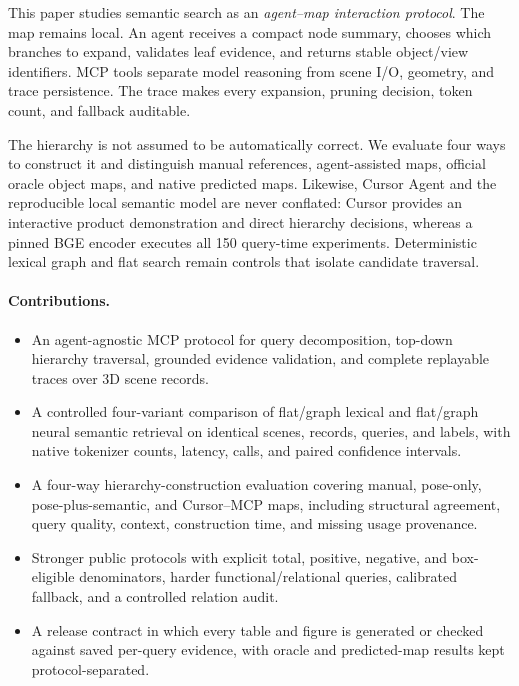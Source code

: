 \documentclass[10pt,twocolumn,letterpaper]{article}
\begin{document}
This paper studies semantic search as an \emph{agent--map interaction
protocol}. The map remains local. An agent receives a compact node summary,
chooses which branches to expand, validates leaf evidence, and returns stable
object/view identifiers. MCP tools separate model reasoning from scene I/O,
geometry, and trace persistence. The trace makes every expansion, pruning
decision, token count, and fallback auditable.

The hierarchy is not assumed to be automatically correct. We evaluate four
ways to construct it and distinguish manual references, agent-assisted maps,
official oracle object maps, and native predicted maps. Likewise, Cursor Agent
and the reproducible local semantic model are never conflated: Cursor provides
an interactive product demonstration and direct hierarchy decisions, whereas a
pinned BGE encoder executes all 150 query-time experiments. Deterministic
lexical graph and flat search remain controls that isolate candidate traversal.

\paragraph{Contributions.}
\begin{itemize}
  \item An agent-agnostic MCP protocol for query decomposition, top-down
  hierarchy traversal, grounded evidence validation, and complete replayable
  traces over 3D scene records.
  \item A controlled four-variant comparison of flat/graph lexical and
  flat/graph neural semantic retrieval on identical scenes, records, queries,
  and labels, with native tokenizer counts, latency, calls, and paired
  confidence intervals.
  \item A four-way hierarchy-construction evaluation covering manual,
  pose-only, pose-plus-semantic, and Cursor--MCP maps, including structural
  agreement, query quality, context, construction time, and missing usage
  provenance.
  \item Stronger public protocols with explicit total, positive, negative, and
  box-eligible denominators, harder functional/relational queries, calibrated
  fallback, and a controlled relation audit.
  \item A release contract in which every table and figure is generated or
  checked against saved per-query evidence, with oracle and predicted-map
  results kept protocol-separated.
\end{itemize}
\end{document}
